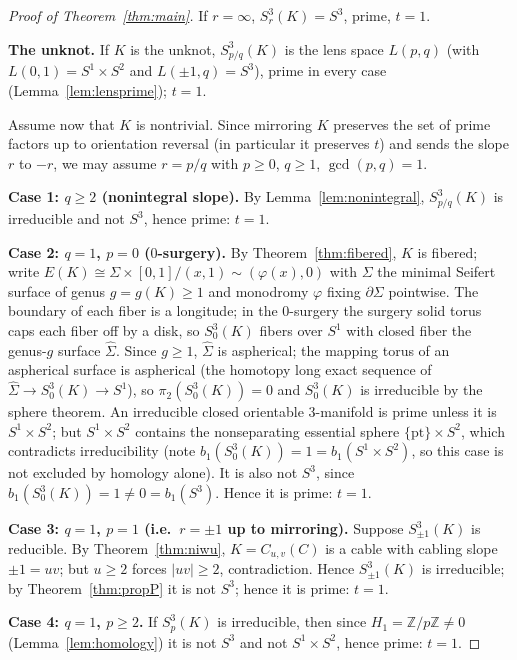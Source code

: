 \documentclass[11pt]{article}
\theoremstyle{definition}
\theoremstyle{remark}
\newcommand{\Z}{\mathbb{Z}}
\begin{document}
\begin{proof}[Proof of Theorem~\ref{thm:main}]
If $r=\infty$, $S^3_r(K)=S^3$, prime, $t=1$.

\medskip
\noindent\textbf{The unknot.}  If $K$ is the unknot, $S^3_{p/q}(K)$ is the
lens space $L(p,q)$ (with $L(0,1)=S^1\times S^2$ and $L(\pm1,q)=S^3$), prime
in every case (Lemma~\ref{lem:lensprime}); $t=1$.

\medskip
Assume now that $K$ is nontrivial.  Since mirroring $K$ preserves the set of
prime factors up to orientation reversal (in particular it preserves $t$) and
sends the slope $r$ to $-r$, we may assume $r=p/q$ with $p\ge 0$, $q\ge 1$,
$\gcd(p,q)=1$.

\medskip
\noindent\textbf{Case 1: $q\ge 2$ (nonintegral slope).}
By Lemma~\ref{lem:nonintegral}, $S^3_{p/q}(K)$ is irreducible and not $S^3$,
hence prime: $t=1$.

\medskip
\noindent\textbf{Case 2: $q=1$, $p=0$ ($0$-surgery).}
By Theorem~\ref{thm:fibered}, $K$ is fibered; write
$E(K)\cong \Sigma\times[0,1]/(x,1)\sim(\varphi(x),0)$ with $\Sigma$ the
minimal Seifert surface of genus $g=g(K)\ge 1$ and monodromy $\varphi$ fixing
$\partial\Sigma$ pointwise.  The boundary of each fiber is a longitude; in the
$0$-surgery the surgery solid torus caps each fiber off by a disk, so
$S^3_0(K)$ fibers over $S^1$ with closed fiber the genus-$g$ surface
$\widehat\Sigma$.  Since $g\ge 1$, $\widehat\Sigma$ is aspherical; the mapping
torus of an aspherical surface is aspherical (the homotopy long exact
sequence of $\widehat\Sigma\to S^3_0(K)\to S^1$), so $\pi_2(S^3_0(K))=0$ and
$S^3_0(K)$ is irreducible by the sphere theorem.  An irreducible closed
orientable $3$-manifold is prime unless it is $S^1\times S^2$; but
$S^1\times S^2$ contains the nonseparating essential sphere
$\{\mathrm{pt}\}\times S^2$, which contradicts irreducibility (note
$b_1(S^3_0(K))=1=b_1(S^1\times S^2)$, so this case is not excluded by homology
alone).  It is also not $S^3$, since $b_1(S^3_0(K))=1\ne 0=b_1(S^3)$.
Hence it is prime: $t=1$.

\medskip
\noindent\textbf{Case 3: $q=1$, $p=1$ (i.e.\ $r=\pm1$ up to mirroring).}
Suppose $S^3_{\pm1}(K)$ is reducible.  By Theorem~\ref{thm:niwu},
$K=C_{u,v}(C)$ is a cable with cabling slope $\pm1=uv$; but $u\ge 2$ forces
$|uv|\ge 2$, contradiction.  Hence $S^3_{\pm1}(K)$ is irreducible; by
Theorem~\ref{thm:propP} it is not $S^3$; hence it is prime: $t=1$.

\medskip
\noindent\textbf{Case 4: $q=1$, $p\ge 2$.}
If $S^3_p(K)$ is irreducible, then since $H_1=\Z/p\Z\ne 0$
(Lemma~\ref{lem:homology}) it is not $S^3$ and not $S^1\times S^2$, hence
prime: $t=1$.


\end{proof}
\end{document}
